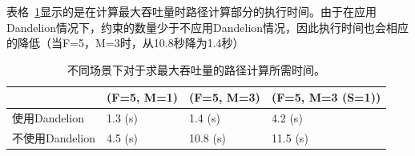 




表格~\ref{table:eval1}显示的是在计算最大吞吐量时路径计算部分的执行时间。由于在应用Dandelion情况下，约束的数量少于不应用Dandelion情况，因此执行时间也会相应的降低（当F=5，M=3时，从10.8秒降为1.4秒）



\begin{table}[]
\centering
\begin{tabular}{l|l|l|l}
\hline
             & \footnotesize(F=5, M=1) & \footnotesize (F=5, M=3) & \footnotesize (F=5, M=3 (S=1)) \\ \hline
使用Dandelion    & 1.3 (s)    & 1.4 (s)    & 4.2 (s)          \\ \hline
不使用Dandelion & 4.5 (s)    & 10.8 (s)   & 11.5 (s)         \\ \hline
\end{tabular}
\caption{\small 不同场景下对于求最大吞吐量的路径计算所需时间。}
\label{table:eval1}
\end{table}

